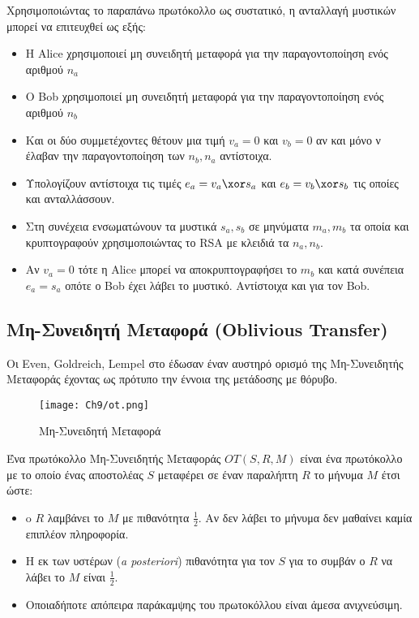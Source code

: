 Χρησιμοποιώντας το παραπάνω πρωτόκολλο ως συστατικό, η ανταλλαγή μυστικών μπορεί να επιτευχθεί ως εξής:
\begin{itemize}
\item Η Alice χρησιμοποιεί μη συνειδητή μεταφορά για την παραγοντοποίηση ενός αριθμού $n_a$
\item Ο Bob χρησιμοποιεί μη συνειδητή μεταφορά για την παραγοντοποίηση ενός αριθμού $n_b$
\item Και οι δύο συμμετέχοντες θέτουν μια τιμή $v_a = 0$ και $v_b = 0$ αν και μόνο ν έλαβαν την παραγοντοποίηση των $n_b, n_a$ αντίστοιχα.
\item Υπολογίζουν αντίστοιχα τις τιμές $e_a = v_a \xor s_a$ και $e_b = v_b \xor s_b$ τις οποίες και ανταλλάσσουν.
\item Στη συνέχεια ενσωματώνουν τα μυστικά $s_a,s_b$ σε μηνύματα $m_a, m_b$ τα οποία και κρυπτογραφούν χρησιμοποιώντας το \gls{RSA} με κλειδιά τα $n_a, n_b$.
\item Αν $v_a = 0$ τότε η Alice μπορεί να αποκρυπτογραφήσει το $m_b$ και κατά συνέπεια $e_a = s_a$ οπότε ο Bob έχει λάβει το μυστικό. Αντίστοιχα και για τον Bob. 
\end{itemize}

\subsection{Μη-Συνειδητή Μεταφορά (Oblivious Transfer)}

Οι Even, Goldreich, Lempel στο \cite{even_randomized_1985} έδωσαν έναν αυστηρό ορισμό της Μη-Συνειδητής Μεταφοράς έχοντας ως πρότυπο την έννοια της μετάδοσης με θόρυβο.

\begin{figure}
	\centering
		\texttt{[image: Ch9/ot.png]}
	\caption{Μη-Συνειδητή Μεταφορά}
	\label{fig:OT}
\end{figure}

\begin{definition}
Ένα πρωτόκολλο Μη-Συνειδητής Μεταφοράς $OT(S,R,M)$ είναι ένα πρωτόκολλο με το οποίο ένας αποστολέας $S$ μεταφέρει σε έναν παραλήπτη $R$ το μήνυμα $M$ έτσι ώστε:
\begin{itemize}
\item o $R$ λαμβάνει το $M$ με πιθανότητα $\frac{1}{2}$. Αν δεν λάβει το μήνυμα δεν μαθαίνει καμία επιπλέον πληροφορία.
\item Η εκ των υστέρων (\textsl{a posteriori}) πιθανότητα για τον $S$ για το συμβάν ο $R$ να λάβει το $M$ είναι $\frac{1}{2}$.
\item Οποιαδήποτε απόπειρα παράκαμψης του πρωτοκόλλου είναι άμεσα ανιχνεύσιμη.
\end{itemize}
\end{definition}

